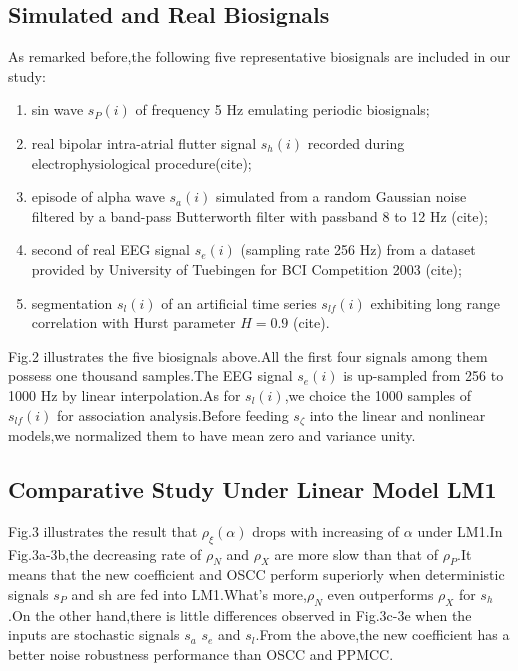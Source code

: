 \documentclass[journal]{IEEEtran}
\begin{document}
  \subsection{Simulated and Real Biosignals}
    As remarked before,the following five representative biosignals are included in our study:
    \begin{enumerate}
      \item sin wave $s_{P}(i)$ of frequency 5 Hz emulating periodic biosignals;
      \item real bipolar intra-atrial flutter signal $s_{h}(i)$ recorded during electrophysiological procedure(cite);
      \item episode of alpha wave $s_{a}(i)$ simulated from a random Gaussian noise filtered by a band-pass Butterworth filter with passband 8 to 12 Hz (cite);
      \item second of real EEG signal $s_{e}(i)$ (sampling rate 256 Hz) from a dataset provided by University of Tuebingen for BCI Competition 2003 (cite);
      \item segmentation $s_{l}(i)$ of an artificial time series $s_{lf}(i)$ exhibiting long range correlation with Hurst parameter $H=0.9$ (cite).
    \end{enumerate}

    Fig.2 illustrates the five biosignals above.All the first four signals among them possess one thousand samples.The EEG signal $s_{e}(i)$ is up-sampled from 256 to 1000 Hz by linear interpolation.As for $s_{l}(i)$,we choice the 1000 samples of $s_{lf}(i)$ for association analysis.Before feeding $s_{\zeta}$ into the linear and nonlinear models,we normalized them to have mean zero and variance unity.

  \subsection{Comparative Study Under Linear Model LM1}
  Fig.3 illustrates the result that $\rho_{\xi}(\alpha)$ drops with increasing of $\alpha$ under LM1.In Fig.3a-3b,the decreasing rate of $\rho_{N}$ and $\rho_{X}$ are more slow than that of $\rho_{P}$.It means that the new coefficient and OSCC perform superiorly when deterministic signals $s_{P}$ and sh are fed into LM1.What’s more,$\rho_{N}$ even outperforms $\rho_{X}$ for $s_{h}$.On the other hand,there is little differences observed in Fig.3c-3e when the inputs are stochastic signals $s_{a}$ $s_{e}$ and $s_{l}$.From the above,the new coefficient has a better noise robustness performance than OSCC and PPMCC.
\end{document}

